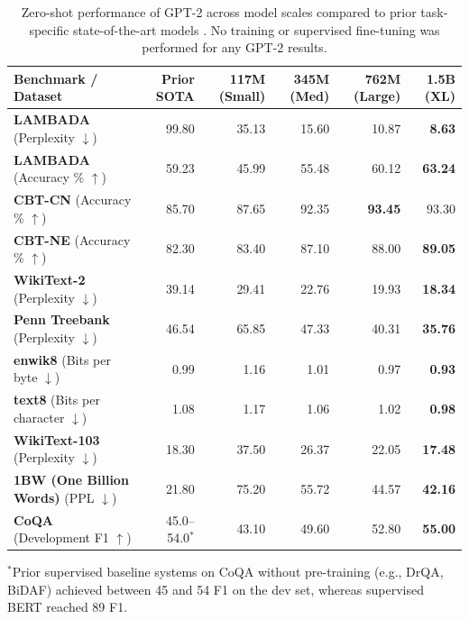 \documentclass[../../../main.tex]{subfiles}
\begin{document}
\begin{table}[t]
\centering
\small
\caption{Zero-shot performance of GPT-2 across model scales compared to prior task-specific state-of-the-art models \cite{radford2019}. No training or supervised fine-tuning was performed for any GPT-2 results.}
\label{tab:gpt2_zero_shot}
\begin{tabularx}{\textwidth}{l r r r r r}
\toprule
\textbf{Benchmark / Dataset} & \textbf{Prior SOTA} & \textbf{117M (Small)} & \textbf{345M (Med)} & \textbf{762M (Large)} & \textbf{1.5B (XL)} \\
\midrule
\textbf{LAMBADA} (Perplexity $\downarrow$) & 99.80 & 35.13 & 15.60 & 10.87 & \textbf{8.63} \\
\textbf{LAMBADA} (Accuracy \% $\uparrow$) & 59.23 & 45.99 & 55.48 & 60.12 & \textbf{63.24} \\
\textbf{CBT-CN} (Accuracy \% $\uparrow$) & 85.70 & 87.65 & 92.35 & \textbf{93.45} & 93.30 \\
\textbf{CBT-NE} (Accuracy \% $\uparrow$) & 82.30 & 83.40 & 87.10 & 88.00 & \textbf{89.05} \\
\textbf{WikiText-2} (Perplexity $\downarrow$) & 39.14 & 29.41 & 22.76 & 19.93 & \textbf{18.34} \\
\textbf{Penn Treebank} (Perplexity $\downarrow$) & 46.54 & 65.85 & 47.33 & 40.31 & \textbf{35.76} \\
\textbf{enwik8} (Bits per byte $\downarrow$) & 0.99 & 1.16 & 1.01 & 0.97 & \textbf{0.93} \\
\textbf{text8} (Bits per character $\downarrow$) & 1.08 & 1.17 & 1.06 & 1.02 & \textbf{0.98} \\
\textbf{WikiText-103} (Perplexity $\downarrow$) & 18.30 & 37.50 & 26.37 & 22.05 & \textbf{17.48} \\
\textbf{1BW (One Billion Words)} (PPL $\downarrow$) & 21.80 & 75.20 & 55.72 & 44.57 & \textbf{42.16} \\
\midrule
\textbf{CoQA} (Development F1 $\uparrow$) & 45.0--54.0$^*$ & 43.10 & 49.60 & 52.80 & \textbf{55.00} \\
\bottomrule
\end{tabularx}
\begin{flushleft}
\footnotesize $^*$Prior supervised baseline systems on CoQA without pre-training (e.g., DrQA, BiDAF) achieved between 45 and 54 F1 on the dev set, whereas supervised BERT reached 89 F1.
\end{flushleft}
\end{table}
\end{document}
